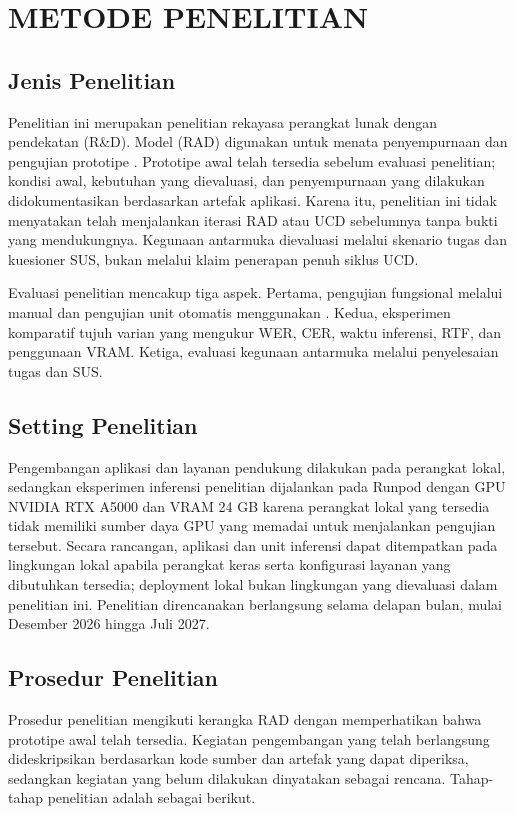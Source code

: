 \chapter{METODE PENELITIAN}

\section{Jenis Penelitian}
Penelitian ini merupakan penelitian rekayasa perangkat lunak dengan pendekatan  (R\&D). Model  (RAD) digunakan untuk menata penyempurnaan dan pengujian prototipe \namasistem. Prototipe awal telah tersedia sebelum evaluasi penelitian; kondisi awal, kebutuhan yang dievaluasi, dan penyempurnaan yang dilakukan didokumentasikan berdasarkan artefak aplikasi. Karena itu, penelitian ini tidak menyatakan telah menjalankan iterasi RAD atau UCD sebelumnya tanpa bukti yang mendukungnya. Kegunaan antarmuka dievaluasi melalui skenario tugas dan kuesioner SUS, bukan melalui klaim penerapan penuh siklus UCD.

Evaluasi penelitian mencakup tiga aspek. Pertama, pengujian fungsional melalui  manual dan pengujian unit otomatis menggunakan . Kedua, eksperimen komparatif tujuh varian  yang mengukur WER, CER, waktu inferensi, RTF, dan penggunaan VRAM. Ketiga, evaluasi kegunaan antarmuka melalui penyelesaian tugas dan SUS.

\section{Setting Penelitian}
Pengembangan aplikasi dan layanan pendukung dilakukan pada perangkat lokal, sedangkan eksperimen inferensi penelitian dijalankan pada  Runpod dengan GPU NVIDIA RTX A5000 dan VRAM 24 GB karena perangkat lokal yang tersedia tidak memiliki sumber daya GPU yang memadai untuk menjalankan pengujian tersebut. Secara rancangan, aplikasi dan unit inferensi dapat ditempatkan pada lingkungan lokal apabila perangkat keras serta konfigurasi layanan yang dibutuhkan tersedia; deployment lokal bukan lingkungan yang dievaluasi dalam penelitian ini. Penelitian direncanakan berlangsung selama delapan bulan, mulai Desember 2026 hingga Juli 2027.

\section{Prosedur Penelitian}
Prosedur penelitian mengikuti kerangka RAD dengan memperhatikan bahwa prototipe awal telah tersedia. Kegiatan pengembangan yang telah berlangsung dideskripsikan berdasarkan kode sumber dan artefak yang dapat diperiksa, sedangkan kegiatan yang belum dilakukan dinyatakan sebagai rencana. Tahap-tahap penelitian adalah sebagai berikut.


